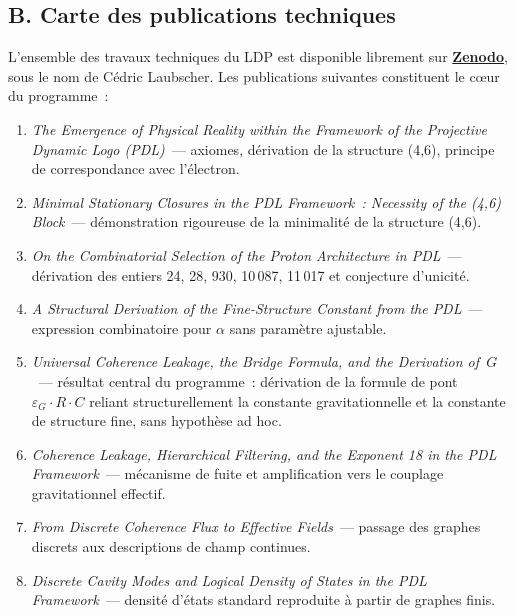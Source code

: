 \documentclass[12pt, a4paper, openright]{book}
\begin{document}
\subsection*{B. Carte des publications techniques}

L'ensemble des travaux techniques du LDP est disponible librement sur \href{https://zenodo.org}{\textbf{Zenodo}}, sous le nom de Cédric Laubscher. Les publications suivantes constituent le c\oe{}ur du programme~:

\begin{enumerate}

\item \textit{The Emergence of Physical Reality within the Framework of the Projective Dynamic Logo (PDL)}~--- axiomes, dérivation de la structure (4,6), principe de correspondance avec l'électron.

\item \textit{Minimal Stationary Closures in the PDL Framework~: Necessity of the (4,6) Block}~--- démonstration rigoureuse de la minimalité de la structure (4,6).

\item \textit{On the Combinatorial Selection of the Proton Architecture in PDL}~--- dérivation des entiers 24, 28, 930, 10\,087, 11\,017 et conjecture d'unicité.

\item \textit{A Structural Derivation of the Fine-Structure Constant from the PDL}~--- expression combinatoire pour $\alpha$ sans paramètre ajustable.

\item \textit{Universal Coherence Leakage, the Bridge Formula, and the Derivation of~$G$}~--- résultat central du programme~: dérivation de la formule de pont $\varepsilon_G \cdot R \cdot C$ reliant structurellement la constante gravitationnelle et la constante de structure fine, sans hypothèse ad hoc.

\item \textit{Coherence Leakage, Hierarchical Filtering, and the Exponent 18 in the PDL Framework}~--- mécanisme de fuite et amplification vers le couplage gravitationnel effectif.

\item \textit{From Discrete Coherence Flux to Effective Fields}~--- passage des graphes discrets aux descriptions de champ continues.

\item \textit{Discrete Cavity Modes and Logical Density of States in the PDL Framework}~--- densité d'états standard reproduite à partir de graphes finis.


\end{enumerate}
\end{document}
